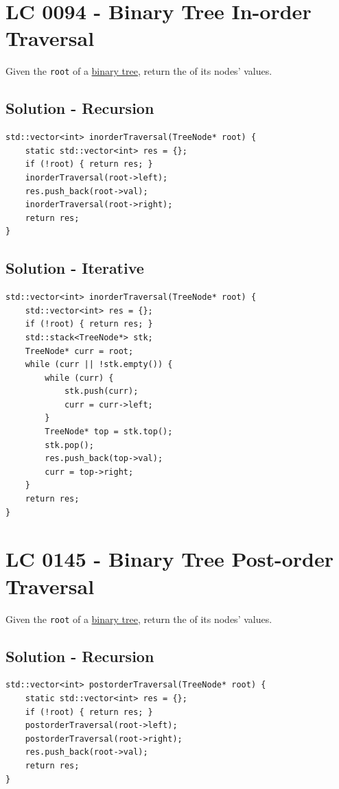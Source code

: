 \section{LC 0094 - Binary Tree In-order Traversal}
Given the {\colorbox{CodeBackground}{\lstinline|root|}} of a \ul{binary tree}, return the {\color{blue}{in-order traversal}} of its nodes' values.

\subsection*{Solution - Recursion}
\begin{lstlisting}
std::vector<int> inorderTraversal(TreeNode* root) {
	static std::vector<int> res = {};
	if (!root) { return res; }
	inorderTraversal(root->left);
	res.push_back(root->val);
	inorderTraversal(root->right);
	return res;
}
\end{lstlisting}

\subsection*{Solution - Iterative}
\begin{lstlisting}
std::vector<int> inorderTraversal(TreeNode* root) {
	std::vector<int> res = {};
	if (!root) { return res; }
	std::stack<TreeNode*> stk;
	TreeNode* curr = root;
	while (curr || !stk.empty()) {
		while (curr) {
			stk.push(curr);
			curr = curr->left;
		}
		TreeNode* top = stk.top();
		stk.pop();
		res.push_back(top->val);
		curr = top->right;
	}
	return res;
}
\end{lstlisting}

\section{LC 0145 - Binary Tree Post-order Traversal}
Given the {\colorbox{CodeBackground}{\lstinline|root|}} of a \ul{binary tree}, return the {\color{blue}{post-order traversal}} of its nodes' values.

\subsection*{Solution - Recursion}
\begin{lstlisting}
std::vector<int> postorderTraversal(TreeNode* root) {
	static std::vector<int> res = {};
	if (!root) { return res; }
	postorderTraversal(root->left);
	postorderTraversal(root->right);
	res.push_back(root->val);
	return res;
}
\end{lstlisting}

